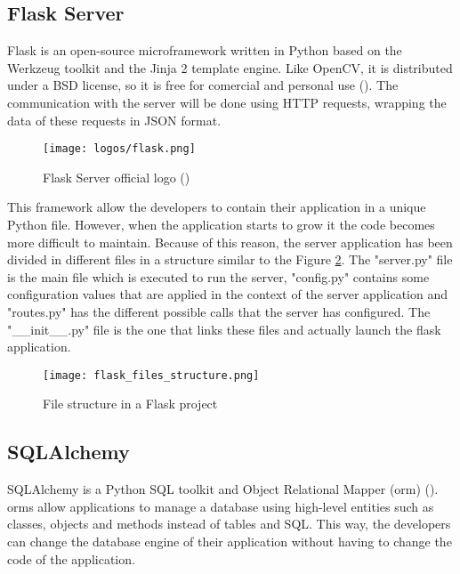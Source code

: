 	\subsection{Flask Server}
	Flask is an open-source microframework written in Python based on the Werkzeug toolkit and the Jinja 2 template engine. Like OpenCV, it is distributed under a BSD license, so it is free for comercial and personal use (\cite{flask_server_docs}). The communication with the server will be done using HTTP requests, wrapping the data of these requests in JSON format.

	\begin{figure}[!ht]
		\centering
		\texttt{[image: logos/flask.png]}
		\caption{Flask Server official logo (\cite{flask_server_docs})}
		\label{fig:flask_server}
	\end{figure}	

	This framework allow the developers to contain their application in a unique Python file. However, when the application starts to grow it the code becomes more difficult to maintain. Because of this reason, the server application has been divided in different files in a structure similar to the Figure \ref{fig:flask_files_struct}. The "server.py" file is the main file which is executed to run the server, "config.py" contains some configuration values that are applied in the context of the server application and "routes.py" has the different possible calls that the server has configured. The "{\_}{\_}init{\_}{\_}.py" file is the one that links these files and actually launch the flask application.

	\begin{figure}[!ht]
		\centering
		\texttt{[image: flask\_files\_structure.png]}
		\caption{File structure in a Flask project}
		\label{fig:flask_files_struct}
	\end{figure}		

	\subsection{SQLAlchemy}
	\label{subsec:sql_alchemy}
	SQLAlchemy is a Python SQL toolkit and Object Relational Mapper (\gls{orm}) (\cite{sqlalchemy_main_website}). \glspl{orm} allow applications to manage a database using high-level entities such as classes, objects and methods instead of tables and SQL. This way, the developers can change the database engine of their application without having to change the code of the application. 

